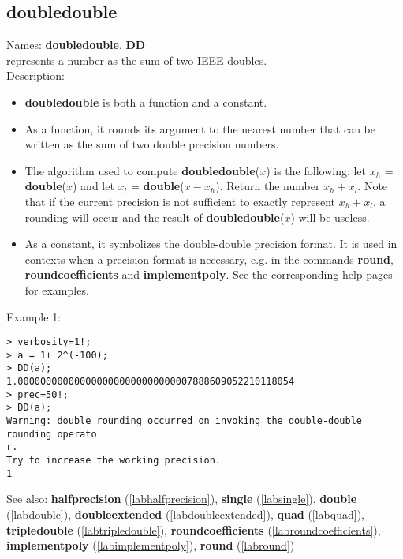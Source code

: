 \subsection{doubledouble}
\label{labdoubledouble}
\noindent Names: \textbf{doubledouble}, \textbf{DD}\\
represents a number as the sum of two IEEE doubles.\\
\noindent Description: \begin{itemize}

\item \textbf{doubledouble} is both a function and a constant.

\item As a function, it rounds its argument to the nearest number that can be written
   as the sum of two double precision numbers.

\item The algorithm used to compute \textbf{doubledouble}($x$) is the following: let $x_h$ = \textbf{double}($x$)
   and let $x_l$ = \textbf{double}($x-x_h$). Return the number $x_h+x_l$. Note that if the current 
   precision is not sufficient to exactly represent $x_h + x_l$, a rounding will occur
   and the result of \textbf{doubledouble}($x$) will be useless.

\item As a constant, it symbolizes the double-double precision format. It is used in 
   contexts when a precision format is necessary, e.g. in the commands 
   \textbf{round}, \textbf{roundcoefficients} and \textbf{implementpoly}.
   See the corresponding help pages for examples.
\end{itemize}
\noindent Example 1: 
\begin{center}\begin{minipage}{15cm}\begin{Verbatim}[frame=single]
> verbosity=1!;
> a = 1+ 2^(-100);
> DD(a);
1.0000000000000000000000000000007888609052210118054
> prec=50!;
> DD(a);
Warning: double rounding occurred on invoking the double-double rounding operato
r.
Try to increase the working precision.
1
\end{Verbatim}
\end{minipage}\end{center}
See also: \textbf{halfprecision} (\ref{labhalfprecision}), \textbf{single} (\ref{labsingle}), \textbf{double} (\ref{labdouble}), \textbf{doubleextended} (\ref{labdoubleextended}), \textbf{quad} (\ref{labquad}), \textbf{tripledouble} (\ref{labtripledouble}), \textbf{roundcoefficients} (\ref{labroundcoefficients}), \textbf{implementpoly} (\ref{labimplementpoly}), \textbf{round} (\ref{labround})
